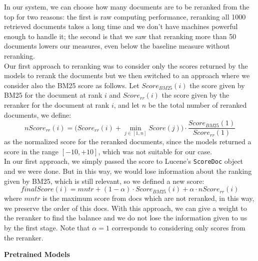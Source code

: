 In our system, we can choose how many documents are to be reranked from the top for two reasons: the first is raw computing performance, reranking all 1000 retrieved documents takes a long time and we don't have machines powerful enough to handle it; the second is that we saw that reranking more than 50 documents lowers our measures, even below the baseline measure without reranking.\\
Our first approach to reranking was to consider only the scores returned by the models to rerank the documents but we then switched to an approach where we consider also the BM25 score as follows. Let $Score_{BM25}(i)$ the score given by BM25 for the document at rank $i$ and $Score_{rr}(i)$ the score given by the reranker for the document at rank $i$, and let $n$ be the total number of reranked documents, we define: 
\begin{equation}
nScore_{rr}(i) = \bigg(Score_{rr}(i)+\min_{j\in [1,n]}Score(j)\bigg)\cdot \frac{Score_{BM25}(1)}{Score_{rr}(1)}
\end{equation}
as the normalized score for the reranked documents, since the models returned a score in the range $[-10,+10]$, which was not suitable for our case.\\
In our first approach, we simply passed the score to Lucene's \texttt{ScoreDoc} object and we were done. But in this way, we would lose information about the ranking given by BM25, which is still relevant, so we defined a new score: 
\begin{equation}
finalScore(i) = mntr + (1-\alpha)\cdot Score_{BM25}(i)+\alpha\cdot nScore_{rr}(i)
\end{equation}
where $mntr$ is the maximum score from docs which are not reranked, in this way, we preserve the order of this docs. With this approach, we can give a weight to the reranker to find the balance and we do not lose the information given to us by the first stage. Note that $\alpha=1$ corresponds to considering only scores from the reranker.

\noindent \textbf{Pretrained Models}

